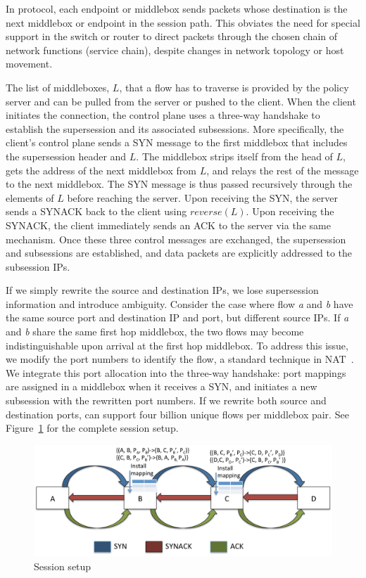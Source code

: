 In \system protocol, each endpoint or middlebox sends packets whose destination is the next middlebox or endpoint in the session path. This obviates the need for special support in the switch or router to direct packets through the chosen chain of network functions (service chain), despite changes in network topology or host movement. 

The list of middleboxes, $L$, that a flow has to traverse is provided by the policy server and can be pulled from the server or pushed to the client. When the client initiates the connection, the control plane uses a three-way handshake to establish the supersession and its associated subsessions. More specifically, the client's control plane sends a SYN message to the first middlebox that includes the supersession header and $L$. The middlebox strips itself from the head of $L$, gets the address of the next middlebox from $L$, and relays the rest of the message to the next middlebox. The SYN message is thus passed recursively through the elements of $L$ before reaching the server. Upon receiving the SYN, the server sends a SYNACK back to the client using $reverse(L)$. Upon receiving the SYNACK, the client immediately sends an ACK to the server via the same mechanism. Once these three control messages are exchanged, the supersession and subsessions are established, and data packets are explicitly addressed to the subsession IPs.

If we simply rewrite the source and destination IPs, we lose supersession information and introduce ambiguity. Consider the case where flow \textit{a} and \textit{b} have the same source port and destination IP and port, but different source IPs. If \textit{a} and \textit{b} share the same first hop middlebox, the two flows may become indistinguishable upon arrival at the first hop middlebox. To address this issue, we modify the port numbers to identify the flow, a standard technique in NAT~\cite{NAT}. We integrate this port allocation into the three-way handshake: port mappings are assigned in a middlebox when it receives a SYN, and initiates a new subsession with the rewritten port numbers. If we rewrite both source and destination ports, \system can support four billion unique flows per middlebox pair. See Figure~\ref{sessionsetup} for the complete session setup.

\begin{figure}[ht]
\centering
\includegraphics[width=\linewidth]{figures/threeway.pdf} 

\caption{\small  Session setup}\label{sessionsetup}
\end{figure}



